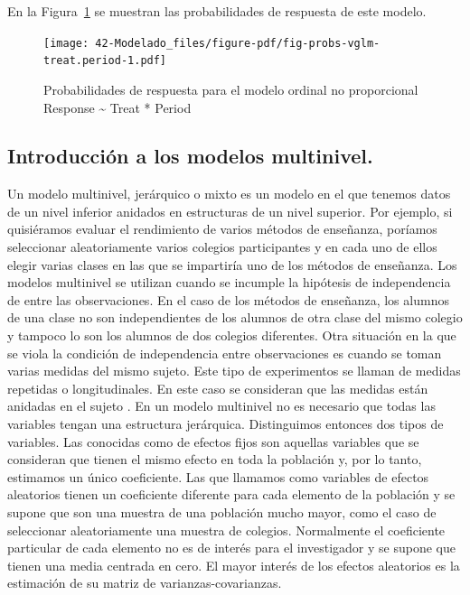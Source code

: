 \documentclass[
  12pt,
  a4paper,
  extrafontsizes,
  onecolumn,
  openright]{memoir}
\begin{document}
\normalsize

En la Figura~\ref{fig-probs-vglm-treat.period} se muestran las
probabilidades de respuesta de este modelo.

\begin{figure}[h]

{\centering \texttt{[image: 42-Modelado\_files/figure-pdf/fig-probs-vglm-treat.period-1.pdf]}

}

\caption{\label{fig-probs-vglm-treat.period}Probabilidades de respuesta
para el modelo ordinal no proporcional Response \textasciitilde{} Treat
* Period}

\end{figure}

\hypertarget{introducciuxf3n-a-los-modelos-multinivel.}{%
\subsection{Introducción a los modelos
multinivel.}\label{introducciuxf3n-a-los-modelos-multinivel.}}

Un modelo multinivel, jerárquico o mixto es un modelo en el que tenemos
datos de un nivel inferior anidados en estructuras de un nivel superior.
Por ejemplo, si quisiéramos evaluar el rendimiento de varios métodos de
enseñanza, poríamos seleccionar aleatoriamente varios colegios
participantes y en cada uno de ellos elegir varias clases en las que se
impartiría uno de los métodos de enseñanza. Los modelos multinivel se
utilizan cuando se incumple la hipótesis de independencia de entre las
observaciones. En el caso de los métodos de enseñanza, los alumnos de
una clase no son independientes de los alumnos de otra clase del mismo
colegio y tampoco lo son los alumnos de dos colegios diferentes. Otra
situación en la que se viola la condición de independencia entre
observaciones es cuando se toman varias medidas del mismo sujeto. Este
tipo de experimentos se llaman de medidas repetidas o longitudinales. En
este caso se consideran que las medidas están anidadas en el sujeto
\autocite[ver][]{Liu2202}. En un modelo multinivel no es necesario que
todas las variables tengan una estructura jerárquica. Distinguimos
entonces dos tipos de variables. Las conocidas como de efectos fijos son
aquellas variables que se consideran que tienen el mismo efecto en toda
la población y, por lo tanto, estimamos un único coeficiente. Las que
llamamos como variables de efectos aleatorios tienen un coeficiente
diferente para cada elemento de la población y se supone que son una
muestra de una población mucho mayor, como el caso de seleccionar
aleatoriamente una muestra de colegios. Normalmente el coeficiente
particular de cada elemento no es de interés para el investigador y se
supone que tienen una media centrada en cero. El mayor interés de los
efectos aleatorios es la estimación de su matriz de
varianzas-covarianzas.
\end{document}
